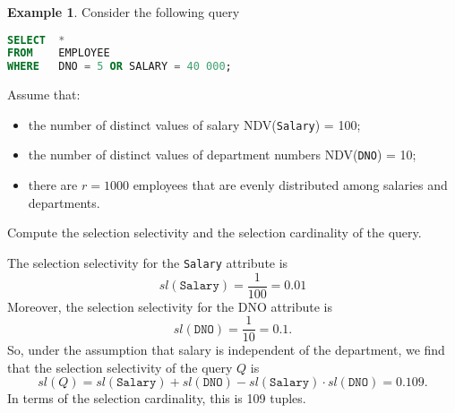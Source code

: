 \documentclass[a4paper, openany]{memoir}
\theoremstyle{definition}
\newtheorem{example}[subsection]{Example}
\begin{document}
\begin{example}
    Consider the following query
\begin{lstlisting}[language=SQL]
SELECT  * 
FROM    EMPLOYEE
WHERE   DNO = 5 OR SALARY = 40 000;
\end{lstlisting}
Assume that:
\begin{itemize}
    \item the number of distinct values of salary NDV(\texttt{Salary}) = 100;
    \item the number of distinct values of department numbers NDV(\texttt{DNO}) = 10;
    \item there are $r = 1000$ employees that are evenly distributed among salaries and departments.
\end{itemize}
Compute the selection selectivity and the selection cardinality of the query.    
\end{example}
\begin{answer}
    The selection selectivity for the \texttt{Salary} attribute is
    \[\textit{sl}(\texttt{Salary}) = \frac{1}{100} = 0.01\]
    Moreover, the selection selectivity for the DNO attribute is
    \[\textit{sl}(\texttt{DNO}) = \frac{1}{10} = 0.1.\]
    So, under the assumption that salary is independent of the department, we find that the selection selectivity of the query $Q$ is
    \[\textit{sl}(Q) = \textit{sl}(\texttt{Salary}) + \textit{sl}(\texttt{DNO}) - \textit{sl}(\texttt{Salary}) \cdot \textit{sl}(\texttt{DNO}) = 0.109.\]
    In terms of the selection cardinality, this is 109 tuples.
\end{answer}
\newpage
\end{document}
